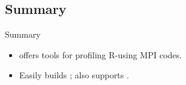 \subsection{Summary}
\makesubcontentsslidessec


\begin{frame}
  \begin{block}{Summary}
    \begin{itemize}
      \item {} offers tools for profiling R-using MPI codes.
      \item Easily builds ; also supports .
    \end{itemize}
  \end{block}
\end{frame}